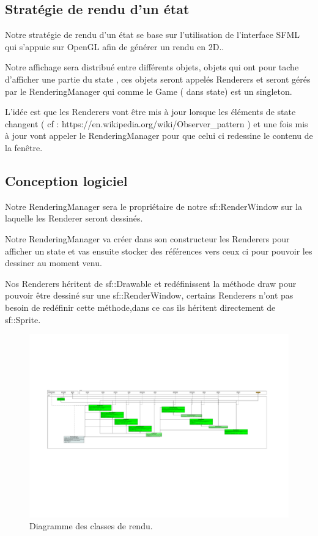 \documentclass[a4paper,12pt]{article}
\begin{document}
\subsection{Stratégie de rendu d'un état}

Notre stratégie de rendu d'un état se base sur l'utilisation de l'interface SFML qui s'appuie sur OpenGL afin de générer un rendu en 2D..

Notre affichage sera distribué entre différents objets, objets qui ont pour tache d'afficher une partie du state , ces objets seront appelés Renderers et seront gérés par le RenderingManager qui comme le Game ( dans state) est un singleton.

L'idée est que les Renderers vont être mis à jour lorsque les éléments de state changent ( cf : https://en.wikipedia.org/wiki/Observer\_pattern ) et une fois mis à jour vont appeler le RenderingManager pour que celui ci redessine le contenu de la fenêtre.

\subsection{Conception logiciel}

Notre RenderingManager sera le propriétaire de notre sf::RenderWindow sur la laquelle les Renderer seront dessinés.

Notre RenderingManager va créer dans son constructeur les Renderers pour afficher un state et vas ensuite stocker des références vers ceux ci pour pouvoir les dessiner au moment venu.

Nos Renderers héritent de sf::Drawable et redéfinissent la méthode draw pour pouvoir être dessiné sur une sf::RenderWindow, certains Renderers n'ont pas besoin de redéfinir cette méthode,dans ce cas ils héritent directement de sf::Sprite.

\begin{landscape}
\begin{figure}[p]
\includegraphics[width=0.9\paperheight, trim=200 900 200 700, clip]{render.pdf}
\caption{\label{uml:render}Diagramme des classes de rendu.} 
\end{figure}
\end{landscape}
\end{document}
